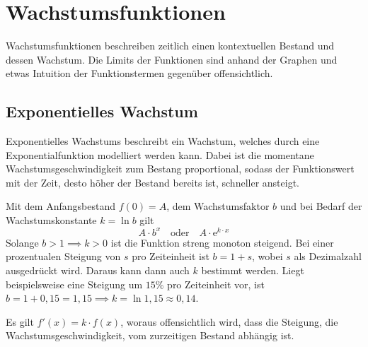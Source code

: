 \documentclass{article}
\begin{document}
 
\section{Wachstumsfunktionen}
Wachstumsfunktionen beschreiben zeitlich einen kontextuellen Bestand und dessen Wachstum. Die Limits der Funktionen sind anhand der Graphen und etwas Intuition der Funktionstermen gegenüber offensichtlich.
\subsection{Exponentielles Wachstum}
Exponentielles Wachstums beschreibt ein Wachstum, welches durch eine Exponentialfunktion modelliert werden kann. Dabei ist die momentane Wachstumsgeschwindigkeit zum Bestang proportional, sodass der Funktionswert mit der Zeit, desto höher der Bestand bereits ist, schneller ansteigt.
 
\noindent \begin{minipage}{5cm}
  \centering
\end{minipage}
\hfill
\begin{minipage}{\dimexpr\textwidth-5cm}
Mit dem Anfangsbestand $f(0)=A$, dem Wachstumsfaktor $b$ und bei Bedarf der Wachstumskonstante $k=\ln{b}$ gilt
\[ 
 A \cdot b^x 
 \quad \text{oder} \quad 
 A \cdot \mathrm{e}^{k \cdot x}  
\] 
Solange ${b > 1 \implies k > 0}$ ist die Funktion streng monoton steigend. Bei einer prozentualen Steigung von $s$ pro Zeiteinheit ist ${b=1+s}$, wobei $s$ als Dezimalzahl ausgedrückt wird. Daraus kann dann auch $k$ bestimmt werden. \newline
Liegt beispielsweise eine Steigung um $15\%$ pro Zeiteinheit vor, ist ${b=1 + 0,15=1,15 \implies k=\ln{1,15} \approx 0,14}$. 
\end{minipage}
Es gilt $f'(x) = k \cdot f(x)$, woraus offensichtlich wird, dass die Steigung, die Wachstumsgeschwindigkeit, vom zurzeitigen Bestand abhängig ist.
 
\end{document}
